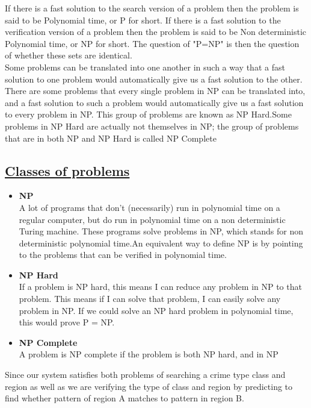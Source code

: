 \hspace{1em}If there is a fast solution to the search version of a problem then the problem is
said to be Polynomial time,
or P for short. If there is a fast solution to the verification version of a problem then the problem is said to be
Non deterministic Polynomial time,
or NP for short. The question of
"P=NP" is then the question of whether these sets are identical.\\

\hspace{1em}Some problems can be translated into one another in such a way that a fast
solution to one problem would automatically give us a fast solution to the
other. There are some problems that every single problem in NP can be
translated into, and a fast solution to such a problem would automatically give
us a fast solution to every problem in NP. This group of problems are known as
NP Hard.Some problems in NP Hard
are actually not themselves in NP; the
group of problems that are in both NP and NP Hard
is called NP Complete

\subsection*{\underline{Classes of problems}}
\begin{itemize}
\item \textbf{NP}\\
A lot of programs that don't (necessarily) run in polynomial time
on a regular computer, but do run in polynomial time on a non deterministic
Turing machine. These programs solve problems in NP, which stands for
non deterministic polynomial time.An equivalent way to define NP is by pointing to the problems that can be
verified in polynomial time.

\item \textbf{NP Hard}\\
If a problem is NP hard,
this means I can reduce any problem in NP to that problem. This means if I can solve that problem, I can easily solve any problem in NP. If we could solve an NP hard
problem in polynomial time, this would
prove P = NP.

\item \textbf{NP Complete}\\
A problem is NP complete
if the problem is both
NP hard, and in NP
\end{itemize}

\noindent
\hspace{5em}Since our system satisfies both problems of searching a crime type class and region as well as we are verifying the type of class and region by predicting to find whether pattern of region A matches to pattern in region B.\\

